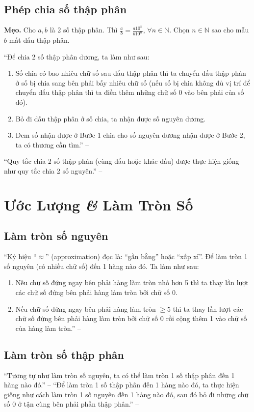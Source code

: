 \documentclass[oneside]{book}
\numberwithin{equation}{section}
\begin{document}
\subsection{Phép chia số thập phân}
\textbf{Mẹo.} Cho $a,b$ là 2 số thập phân. Thì $\frac{a}{b} = \frac{a10^n}{b10^n}$, $\forall n\in\mathbb{N}$. Chọn $n\in\mathbb{N}$ sao cho mẫu $b$ mất dấu thập phân.

``Để chia 2 số thập phân dương, ta làm như sau:
\begin{enumerate}
	\item Số chia có bao nhiêu chữ số sau dấu thập phân thì ta chuyển dấu thập phân ở số bị chia sang bên phải bấy nhiêu chữ số (nếu số bị chia không đủ vị trí để chuyển dấu thập phân thì ta điền thêm những chữ số 0 vào bên phải của số đó).
	\item Bỏ đi dấu thập phân ở số chia, ta nhận được số nguyên dương.
	\item Đem số nhận được ở Bước 1 chia cho số nguyên dương nhận được ở Bước 2, ta có thương cần tìm.'' -- \cite[p. 54]{Thai_Anh_Dat_Ha_Loan_Nam_Quang_Toan_6_tap_2}
\end{enumerate}
``Quy tắc chia 2 số thập phân (cùng dấu hoặc khác dấu) được thực hiện giống như quy tắc chia 2 số nguyên.'' -- \cite[p. 55]{Thai_Anh_Dat_Ha_Loan_Nam_Quang_Toan_6_tap_2}

\section{Ước Lượng \textit{\&} Làm Tròn Số}

\subsection{Làm tròn số nguyên}
``Ký hiệu ``$\approx$'' (approximation) đọc là: ``gần bằng'' hoặc ``xấp xỉ''. Để làm tròn 1 số nguyên (có nhiều chữ số) đến 1 hàng nào đó. Ta làm như sau:
\begin{enumerate}
	\item Nếu chữ số đứng ngay bên phải hàng làm tròn nhỏ hơn 5 thì ta thay lần lượt các chữ số đứng bên phải hàng làm tròn bởi chữ số 0.
	\item Nếu chữ số đứng ngay bên phải hàng làm tròn $\ge 5$ thì ta thay lần lượt các chữ số đứng bên phải hàng làm tròn bởi chữ số 0 rồi cộng thêm 1 vào chữ số của hàng làm tròn.'' -- \cite[p. 58]{Thai_Anh_Dat_Ha_Loan_Nam_Quang_Toan_6_tap_2}
\end{enumerate}

\subsection{Làm tròn số thập phân}
``Tương tự như làm tròn số nguyên, ta có thể làm tròn 1 số thập phân đến 1 hàng nào đó.'' -- \cite[p. 58]{Thai_Anh_Dat_Ha_Loan_Nam_Quang_Toan_6_tap_2} ``Để làm tròn 1 số thập phân đến 1 hàng nào đó, ta thực hiện giống như cách làm tròn 1 số nguyên đến 1 hàng nào đó, sau đó bỏ đi những chữ số 0 ở tận cùng bên phải phần thập phân.'' -- \cite[p. 59]{Thai_Anh_Dat_Ha_Loan_Nam_Quang_Toan_6_tap_2}
\end{document}
